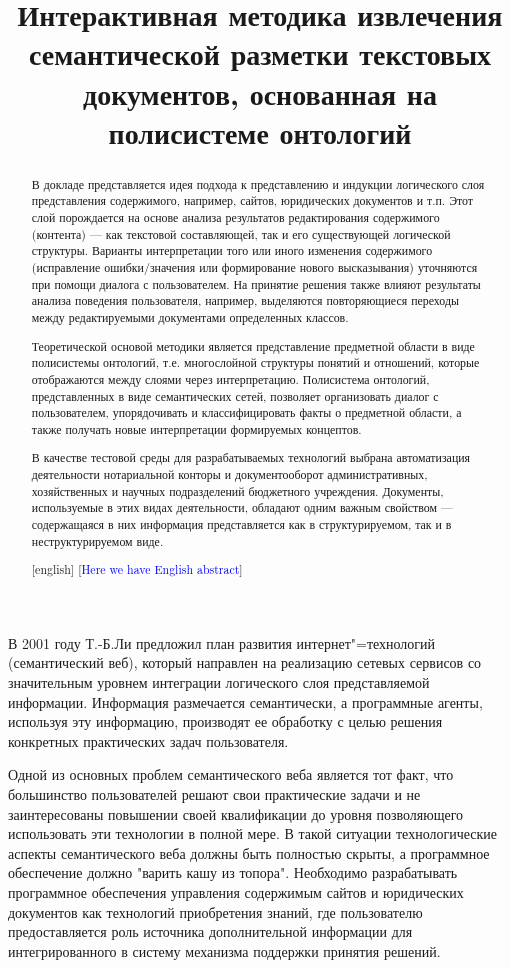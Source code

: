 \documentclass[utf8]{../IncArticle}
\title{Интерактивная методика извлечения семантической разметки
  текстовых документов, основанная на полисистеме онтологий
  \e{Первоначальный заголовок: Методика ПРИОБРЕТЕНИЯ знаний из
    текстовых документов, основанная на анализе ответов пользователя и
    полисистемы онтологий} }
\date{}
\newcommand{\e}[2][fcolor]{\textcolor{pcolor}{[}\textcolor{#1}{#2}\textcolor{pcolor}{]}}
\begin{document}
\begin{abstract}

  В докладе представляется идея подхода к представлению и индукции
  логического слоя представления содержимого, например, сайтов,
  юридических документов и т.п. Этот слой порождается на основе
  анализа результатов редактирования содержимого (контента) --- как
  текстовой составляющей, так и его существующей логической структуры.
  Варианты интерпретации того или иного изменения содержимого
  (исправление ошибки/значения или формирование нового высказывания)
  уточняются при помощи диалога с пользователем.  На принятие решения
  также влияют результаты анализа поведения пользователя, например,
  выделяются повторяющиеся переходы между редактируемыми документами
  определенных классов.

  Теоретической основой методики является представление предметной
  области в виде полисистемы онтологий, т.е. многослойной структуры
  понятий и отношений, которые отображаются между слоями через
  интерпретацию.  Полисистема онтологий, представленных в виде
  семантических сетей, позволяет организовать диалог с пользователем,
  упорядочивать и классифицировать факты о предметной области, а также
  получать новые интерпретации формируемых концептов.

  В качестве тестовой среды для разрабатываемых технологий выбрана
  автоматизация деятельности нотариальной конторы и документооборот
  административных, хозяйственных и научных подразделений бюджетного
  учреждения.  Документы, используемые в этих видах деятельности,
  обладают одним важным свойством --- содержащаяся в них информация
  представляется как в структурируемом, так и в неструктурируемом
  виде.

\end{abstract}

\begin{abstract}[english]
  \e[blue]{Here we have English abstract}
\end{abstract}


\introduction{}

В 2001 году Т.-Б.Ли предложил план развития интернет"=технологий
(семантический веб), который направлен на реализацию сетевых сервисов
со значительным уровнем интеграции логического слоя представляемой
информации.  Информация размечается семантически, а программные агенты,
используя эту информацию, производят ее обработку с целью решения
конкретных практических задач пользователя.

Одной из основных проблем семантического веба является тот факт, что
большинство пользователей решают свои практические задачи и не
заинтересованы повышении своей квалификации до уровня позволяющего
использовать эти технологии в полной мере.  В такой ситуации
технологические аспекты семантического веба должны быть полностью
скрыты, а программное обеспечение должно "варить кашу из
топора".  Необходимо разрабатывать программное обеспечения управления
содержимым сайтов и юридических документов как технологий приобретения
знаний, где пользователю предоставляется роль источника дополнительной
информации для интегрированного в систему механизма поддержки принятия
решений.
\end{document}
